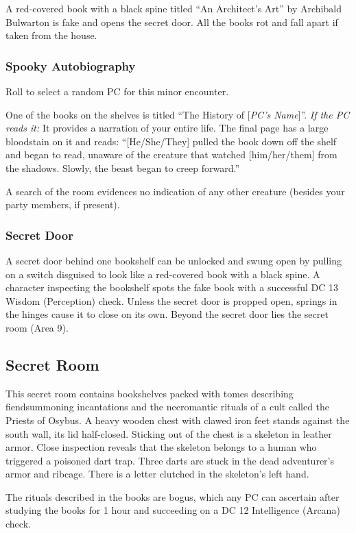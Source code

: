 A red-covered book with a black spine titled ``An Architect's Art'' by Archibald Bulwarton is fake and opens
the secret door. All the books rot and fall apart if taken from the house.

\subsubsection*{Spooky Autobiography}
Roll to select a random PC for this minor encounter.
\begin{readout}
  One of the books on the shelves is titled ``The History of [\textit{PC's Name}]''.
  \textit{If the PC reads it:} It provides a narration of your entire life. The final page has a large
  bloodstain on it and reads: ``[He/She/They] pulled the book down off the shelf and began to read, unaware
  of the creature that watched [him/her/them] from the shadows. Slowly, the beast began to creep forward.''
\end{readout}
A search of the room evidences no indication of any other creature (besides your party members, if present).

\subsubsection*{Secret Door}
A secret door behind one bookshelf can be unlocked and swung open by pulling on a switch disguised to look like
a red-covered book with a black spine. A character inspecting the bookshelf spots the fake book with a successful
DC 13 Wisdom (Perception) check. Unless the secret door is propped open, springs in the hinges cause it to
close on its own. Beyond the secret door lies the secret room (Area 9).

\begin{arealinks}
\end{arealinks}


\pagebreak
\subsection{Secret Room}
\label{sec:SecretRoom}
\begin{readout}
  This secret room contains bookshelves packed with tomes describing fiendsummoning incantations and the
  necromantic rituals of a cult called the Priests of Osybus. A heavy wooden chest with clawed iron feet
  stands against the south wall, its lid half-closed. Sticking out of the chest is a skeleton in leather
  armor. Close inspection reveals that the skeleton belongs to a human who triggered a poisoned dart trap.
  Three darts are stuck in the dead adventurer's armor and ribcage. There is a letter clutched in the
  skeleton's left hand.
\end{readout}
The rituals described in the books are bogus, which any PC can ascertain after studying the books for 1 hour
and succeeding on a DC 12 Intelligence (Arcana) check.

